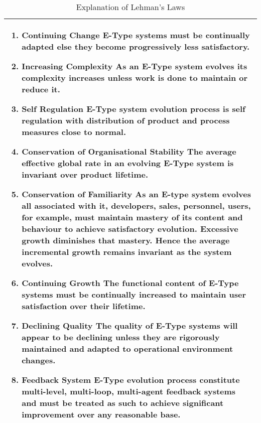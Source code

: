 \documentclass{sig-alternate}
\begin{document}
\begin{table}
       \centering
       \begin{tabular}[ht]{p{3in}}
       \toprule
              \begin{enumerate}
              \item \textbf{Continuing Change}  \newline
              E-Type systems must be continually adapted else they become progressively less satisfactory.                     
              \item \textbf{Increasing Complexity} \newline
              As an E-Type system evolves its complexity increases unless work is done to maintain or reduce it.                  
              \item \textbf{Self Regulation} \newline
              E-Type system evolution process is self regulation with distribution of product and process measures close to normal.                     
              \item \textbf{Conservation of Organisational Stability} \newline
              The average effective global rate in an evolving E-Type system is invariant over product lifetime.                     
              \item \textbf{Conservation of Familiarity} \newline
              As an E-type system evolves all associated with it, developers, sales, personnel, users, for example, must maintain mastery of its content and behaviour to achieve satisfactory evolution. Excessive growth diminishes that mastery. Hence the average incremental growth remains invariant as the system evolves.                     
              \item \textbf{Continuing Growth} \newline
              The functional content of E-Type systems must be continually increased to maintain user satisfaction over their lifetime.                
              \item \textbf{Declining Quality} \newline
              The quality of E-Type systems will appear to be declining unless they are rigorously maintained and adapted to operational environment changes.                     
              \item \textbf{Feedback System} \newline
              E-Type evolution process constitute multi-level, multi-loop, multi-agent feedback systems and must be treated as such to achieve significant improvement over any reasonable base.

              \end{enumerate} \\
              \bottomrule
       \end{tabular}
       \caption{Explanation of Lehman's Laws}
       \label{table:expl_laws}
\end{table}
\end{document}
